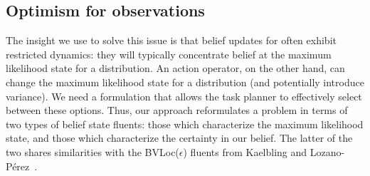 \subsection{Optimism for observations}
\label{sec-optimism}
The insight we use to solve this issue is that belief updates for
\mld{} often exhibit restricted dynamics: they will typically
concentrate belief at the maximum likelihood state for a
distribution. An action operator, on the other hand, can change the
maximum likelihood state for a distribution (and potentially
introduce variance). We need a formulation that
allows the task planner to effectively select between these
options. Thus, our approach reformulates a problem in terms of two
types of belief state fluents: those which characterize the maximum
likelihood state, and those which characterize the certainty in our
belief. The latter of the two shares similarities with the
BVLoc($\epsilon$) fluents from Kaelbling and
Lozano-P\'erez~\cite{kaelbling2013integrated}.

